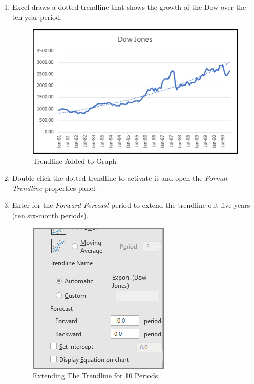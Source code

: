 \begin{enumbox}
\begin{enumerate}
		\item Excel draws a dotted trendline that shows the growth of the Dow over the ten-year period.
	
		\begin{figure}[H]
			\centering
			\includegraphics[width=\maxwidth{.95\linewidth}]{gfx/ch08_fig08}
			\caption{Trendline Added to Graph}
			\label{08:fig08}
		\end{figure}
	
		\item Double-click the dotted trendline to activate it and open the \textit{Format Trendline} properties panel.
		\item Enter  for the \textit{Forward Forecast} period to extend the trendline out five years (ten six-month periods).
	
		\begin{figure}[H]
			\centering
			\includegraphics[width=\maxwidth{.50\linewidth}]{gfx/ch08_fig09}
			\caption{Extending The Trendline for 10 Periods}
			\label{08:fig09}
		\end{figure}
	

\end{enumerate}
\end{enumbox}

